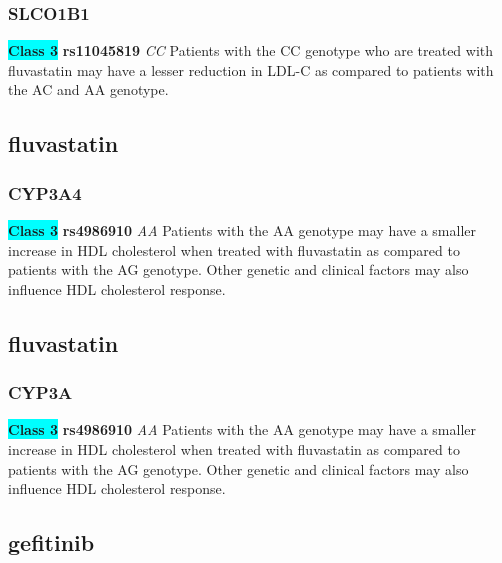 \documentclass{book}
\begin{document}
\subsubsection{ SLCO1B1 }

\begin{center}
\textbf{\colorbox{cyan} {Class 3}} \textbf{ rs11045819 } \textit{ CC }
Patients with the CC genotype who are treated with fluvastatin may have a lesser reduction in LDL-C as compared to patients with the AC and AA genotype.


\end{center}\subsection{ fluvastatin }


\subsubsection{ CYP3A4 }

\begin{center}
\textbf{\colorbox{cyan} {Class 3}} \textbf{ rs4986910 } \textit{ AA }
Patients with the AA genotype may have a smaller increase in HDL cholesterol when treated with fluvastatin as compared to patients with the AG genotype. Other genetic and clinical factors may also influence HDL cholesterol response.


\end{center}\subsection{ fluvastatin }


\subsubsection{ CYP3A }

\begin{center}
\textbf{\colorbox{cyan} {Class 3}} \textbf{ rs4986910 } \textit{ AA }
Patients with the AA genotype may have a smaller increase in HDL cholesterol when treated with fluvastatin as compared to patients with the AG genotype. Other genetic and clinical factors may also influence HDL cholesterol response.


\end{center}\subsection{ gefitinib }
\end{document}

